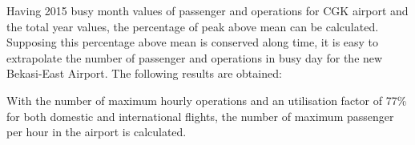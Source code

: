 Having 2015 busy month values of passenger and operations for CGK airport and the total year values, the percentage of peak above mean can be calculated. Supposing this percentage above mean is conserved along time, it is easy to extrapolate the number of passenger and operations in busy day for the new Bekasi-East Airport. The following results are obtained:


With the number of maximum hourly operations and an utilisation factor of 77\% for both domestic and international flights, the number of maximum passenger per hour in the airport is calculated.

	
	